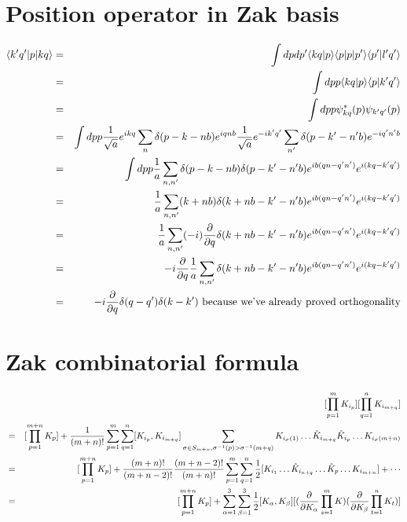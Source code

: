 \documentclass[12pt]{article}
\begin{document}
\section{Position operator in Zak basis}
\begin{eqnarray}
\langle k'q'|p|kq\rangle &=& \int dpdp'\langle kq|p\rangle\langle p|p|p'\rangle\langle p'|l'q'\rangle \\
&=& \int dp p\langle kq|p\rangle\langle p|k'q'\rangle \\
&=& \int dp p \psi^*_{kq}(p)\psi_{k'q'}(p) \\
&=& \int dp p {1\over\sqrt a}e^{ikq}\sum_n\delta(p-k-nb)e^{iqnb} {1\over\sqrt a}e^{-ik'q'}\sum_{n'}\delta(p-k'-n'b)e^{-iq'n'b}\\
&=& \int dp p {1\over a}\sum_{n,n'}\delta(p-k-nb)\delta(p-k'-n'b)e^{ib(qn-q'n')}e^{i(kq-k'q')}\\
&=& {1\over a}\sum_{n,n'}(k+nb)\delta(k+nb-k'-n'b)e^{ib(qn-q'n')}e^{i(kq-k'q')}\\
&=& {1\over a}\sum_{n,n'}(-i){\partial\over\partial q}\delta(k+nb-k'-n'b)e^{ib(qn-q'n')}e^{i(kq-k'q')}\\
&=& -i{\partial\over\partial q}{1\over a}\sum_{n,n'}\delta(k+nb-k'-n'b)e^{ib(qn-q'n')}e^{i(kq-k'q')}\\
&=& -i{\partial\over\partial q}\delta(q-q')\delta(k-k') \mbox{ because we've already proved orthogonality} \\
\end{eqnarray}

\section{Zak combinatorial formula}
\begin{eqnarray}&& [\prod_{p=1}^mK_{i_p}][\prod_{q=1}^nK_{i_{m+q}}] \\
&=& [\prod_{p=1}^{m+n}K_p]+{1\over(m+n)!}\sum_{p=1}^m\sum_{q=1}^n[K_{i_p},K_{i_{m+q}}]\sum_{\sigma\in S_{m+n},\sigma^{-1}(p)>\sigma^{-1}(m+q)}K_{i_\sigma(1)}\ldots\hat{K}_{i_{m+q}}\hat{K}_{i_{p}}\ldots K_{i_\sigma(m+n)} \\
&=& [\prod_{p=1}^{m+n}K_p]+{(m+n)!\over(m+n-2)!}{(m+n-2)!\over(m+n)!}\sum_{p=1}^m\sum_{q=1}^n{1\over2} [K_{i_1}\ldots\hat{K}_{i_{n+q}}\ldots\hat{K}_p\ldots K_{i_{m+n}}] + \cdots \\
&=& [\prod_{p=1}^{m+n}K_p]+\sum_{\alpha=1}^3\sum_{\beta=1}^3{1\over2}[K_\alpha,K_\beta][({\partial\over\partial K_\alpha}\prod_{s=1}^m K)({\partial\over\partial K_\beta}\prod_{t=1}^n K_t)]
\end{eqnarray}
\end{document}
